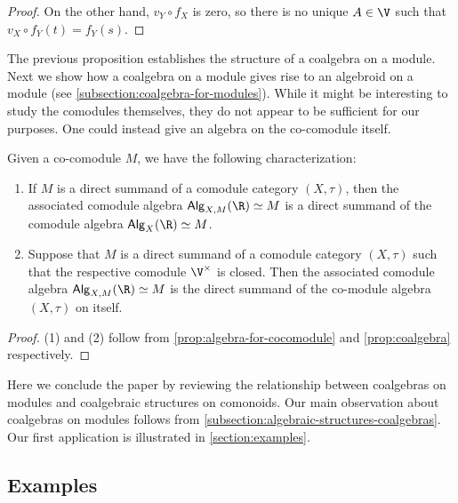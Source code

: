 \documentclass[a4paper,reqno,oneside]{article}
\begin{document}
\begin{proof}
    On the other hand, $v_Y \circ f_X$ is zero, so there is no unique $A \in \V$ such that $v_X \circ f_Y(t) = f_Y(s)$.
\end{proof}

The previous proposition establishes the structure of a coalgebra on a module.  Next we show how a coalgebra on a module gives rise to an algebroid on a module (see \cref{subsection:coalgebra-for-modules}).  While it might be interesting to study the comodules themselves, they do not appear to be sufficient for our purposes.  One could instead give an algebra on the co-comodule itself.

\begin{proposition}\label{prop:algebra-for-cocomodule}
Given a co-comodule $M$, we have the following characterization:
\begin{enumerate}[label=\arabic*]
    \item If $M$ is a direct summand of a comodule category $(X,\tau)$, then the associated comodule algebra $\mathsf{Alg}_{X,M}(\R) \simeq M$ is a direct summand of the comodule algebra $\mathsf{Alg}_X(\R) \simeq M$.
    \item Suppose that $M$ is a direct summand of a comodule category $(X,\tau)$ such that the respective comodule $\V^\times$ is closed.  Then the associated comodule algebra $\mathsf{Alg}_{X,M}(\R) \simeq M$ is the direct summand of the co-module algebra $(X,\tau)$ on itself.
\end{enumerate}
\end{proposition}
\begin{proof}
    (1) and (2) follow from \cref{prop:algebra-for-cocomodule} and \cref{prop:coalgebra} respectively.
\end{proof}

Here we conclude the paper by reviewing the relationship between coalgebras on modules and coalgebraic structures on comonoids.  Our main observation about coalgebras on modules follows from \cref{subsection:algebraic-structures-coalgebras}.  Our first application is illustrated in \cref{section:examples}.

\subsection{Examples}
\end{document}
